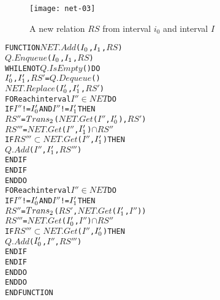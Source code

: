 \documentclass[11pt]{report}
\newenvironment{vverbatim}
{
  \begin{alltt}
}
{
    \vspace{-\baselineskip}
  \end{alltt}
}
\newlength{\valgorithmboxwidth}
\newenvironment{valgorithm}[3][tbhp]
{
  \setlength{\valgorithmboxwidth}{\linewidth-2em}

  \begin{valgorithmfloat}[#1]
    \caption{#2}
    \label{#3}
    \hspace{1em}
    \begin{lrbox}{\valgorithmbox}
      \begin{minipage}[l]{\valgorithmboxwidth}
        \small
        \begin{vverbatim}
}
{
        \end{vverbatim}
      \end{minipage}
    \end{lrbox}
    \framebox[\valgorithmboxwidth][l]{\usebox{\valgorithmbox}}
  \end{valgorithmfloat}
}
\begin{document}
          \begin{figure}[tbhp]
            \begin{center}
              \texttt{[image: net-03]}
              \caption{A new relation $RS$ from interval $i_0$ and interval $I$}
              \label{fig-net-ex-03}
            \end{center}
          \end{figure}

          \begin{valgorithm}[tbhp]{$NET.Add()$}{algo-net-add}
FUNCTION \(NET.Add\)(\(I\sb{0}\), \(I\sb{1}\), \(RS\))
  \(Q.Enqueue\)(\(I\sb{0}\), \(I\sb{1}\), \(RS\))
  WHILE NOT \(Q.IsEmpty\)() DO
    \(I\sb{0}'\), \(I\sb{1}'\), \(RS'\) = \(Q.Dequeue\)()
    \(NET.Replace\)(\(I\sb{0}'\), \(I\sb{1}'\), \(RS'\))
    FOR each interval \(I''\) \(\in\) \(NET\) DO
      IF \(I''\) != \(I\sb{0}'\) AND \(I''\) != \(I\sb{1}'\) THEN
        \(RS''\) =  \(Trans\sb{2}\)(\(NET.Get\)(\(I''\), \(I\sb{0}'\)), \(RS'\))
        \(RS'''\) = \(NET.Get\)(\(I''\), \(I\sb{1}'\)) \(\cap\) \(RS''\)
        IF \(RS'''\) \(\subset\) \(NET.Get\)(\(I''\), \(I\sb{1}'\)) THEN
          \(Q.Add\)(\(I''\), \(I\sb{1}'\), \(RS'''\))
        ENDIF
      ENDIF
    ENDDO
    FOR each interval \(I''\) \(\in\) \(NET\) DO
      IF \(I''\) != \(I\sb{0}'\) AND \(I''\) != \(I\sb{1}'\) THEN
        \(RS''\) =  \(Trans\sb{2}\)(\(RS'\), \(NET.Get\)(\(I\sb{1}'\), \(I''\)))
        \(RS'''\) = \(NET.Get\)(\(I\sb{0}'\), \(I''\)) \(\cap\) \(RS''\)
        IF \(RS'''\) \(\subset\) \(NET.Get\)(\(I''\), \(I\sb{0}'\)) THEN
          \(Q.Add\)(\(I\sb{0}'\), \(I''\), \(RS'''\))
        ENDIF
      ENDIF
    ENDDO
  ENDDO
ENDFUNCTION
          \end{valgorithm}
\end{document}
